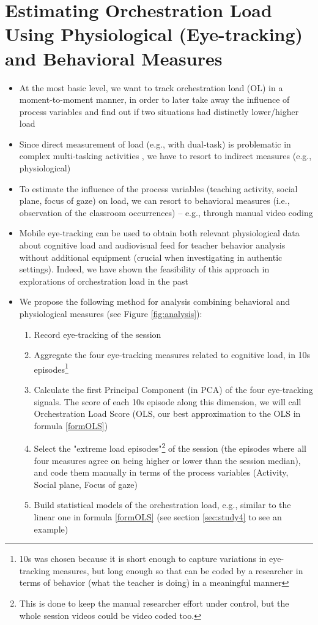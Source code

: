 \documentclass[10pt,journal,compsoc]{IEEEtran}
\begin{document}
\section{Estimating Orchestration Load Using Physiological (Eye-tracking) and Behavioral Measures}
\label{sec:measures}
\begin{itemize}
\item At the most basic level, we want to track orchestration load (OL) in a moment-to-moment manner, in order to later take away the influence of process variables and find out if two situations had distinctly lower/higher load
\item Since direct measurement of load (e.g., with dual-task) is problematic in complex multi-tasking activities \cite{Paas2003}, we have to resort to indirect measures (e.g., physiological)
\item To estimate the influence of the process variables (teaching activity, social plane, focus of gaze) on load, we can resort to behavioral measures (i.e., observation of the classroom occurrences) -- e.g., through manual video coding
\item Mobile eye-tracking can be used to obtain both relevant physiological data about cognitive load \cite{Buettner2013} and audiovisual feed for teacher behavior analysis without additional equipment (crucial when investigating in authentic settings). Indeed, we have shown the feasibility of this approach in explorations of orchestration load in the past \cite{Prieto2014,Prieto2015cscl,Prieto2015ectel}
\item We propose the following method for analysis combining behavioral and physiological measures (see Figure \ref{fig:analysis}):
\begin{enumerate}
\item Record eye-tracking of the session
\item Aggregate the four eye-tracking measures related to cognitive load, in 10s episodes\footnote{10s was chosen because it is short enough to capture variations in eye-tracking measures, but long enough so that can be coded by a researcher in terms of behavior (what the teacher is doing) in a meaningful manner}
\item Calculate the first Principal Component (in PCA) of the four eye-tracking signals. The score of each 10s episode along this dimension, we will call Orchestration Load Score (OLS, our best approximation to the OLS in formula \ref{formOLS}) %
\item Select the "extreme load episodes"\footnote{This is done to keep the manual researcher effort under control, but the whole session videos could be video coded too.} of the session (the episodes where all four measures agree on being higher or lower than the session median), and code them manually in terms of the process variables (Activity, Social plane, Focus of gaze)
\item Build statistical models of the orchestration load, e.g.,  similar to the linear one in formula \ref{formOLS} (see section \ref{sec:study4} to see an example)
\end{enumerate}
\end{itemize}
\end{document}
